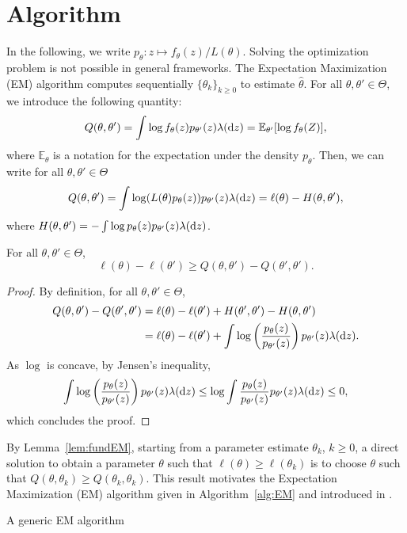 \documentclass[english,graybox,envcountchap,envcountsame,sectrefs,shortlabels]{svmono}
\theoremstyle{style}
\newcommand{\eqsp}{}
\begin{document}
\section{Algorithm}
In the following, we write $p_\theta:z\mapsto f_\theta(z)/L(\theta)$. Solving the optimization problem is not possible in general frameworks. The Expectation Maximization (EM) algorithm computes sequentially $\{\theta_k\}_{k\geq 0}$ to estimate $\widehat \theta$. For all $\theta,\theta'\in\Theta$, we introduce the following quantity:
$$
Q(\theta,\theta') = \int \log f_\theta(z)p_{\theta'}(z)\lambda(\rmd z) = \mathbb{E}_{\theta'}[\log f_\theta(Z)]\eqsp,
$$
where $\mathbb{E}_{\theta}$ is a notation for the expectation under the density $p_\theta$. Then, we can write for all $\theta,\theta'\in\Theta$
$$
Q(\theta,\theta') = \int \log (L(\theta)p_\theta(z))p_{\theta'}(z)\lambda(\rmd z) = \ell(\theta) - H(\theta,\theta')\eqsp,
$$
where $H(\theta,\theta') = - \int \log p_\theta(z) p_{\theta'}(z)\lambda(\mathrm{d} z)$.

\begin{lemma}
\label{lem:fundEM}
For all $\theta,\theta'\in\Theta$,
$$
\ell(\theta)-\ell(\theta')\geq Q(\theta,\theta')-Q(\theta',\theta')\eqsp.
$$
\end{lemma}
\begin{proof}
By definition, for all $\theta,\theta'\in\Theta$,
\begin{align*}
Q(\theta,\theta')-Q(\theta',\theta') &= \ell(\theta)-\ell(\theta') + H(\theta',\theta') - H(\theta,\theta')\\
&= \ell(\theta)-\ell(\theta') + \int \log\left(\frac{p_\theta(z)}{p_{\theta'}(z)}\right)p_{\theta'}(z)\lambda(\rmd z)\eqsp.
\end{align*}
As $\log$ is concave, by Jensen's inequality, 
$$
\int \log\left(\frac{p_\theta(z)}{p_{\theta'}(z)}\right)p_{\theta'}(z)\lambda(\rmd z) \leq \log\int \frac{p_\theta(z)}{p_{\theta'}(z)}p_{\theta'}(z)\lambda(\rmd z) \leq 0\eqsp,
$$
which concludes the proof.
\end{proof}
By Lemma~\ref{lem:fundEM}, starting from a parameter estimate $\theta_k$, $k\geq 0$, a direct solution to obtain a parameter $\theta$ such that $\ell(\theta) \geq \ell(\theta_k)$ is to choose $\theta$ such that $Q(\theta,\theta_k)\geq Q(\theta_k,\theta_k)$. This result motivates the Expectation Maximization (EM) algorithm given in Algorithm~\ref{alg:EM} and introduced in \cite{}.

\begin{algorithm}
\caption{A generic EM algorithm}\label{alg:EM}
\end{algorithm}
\end{document}
